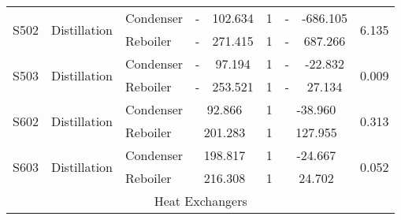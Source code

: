 \begin{table}[h]
{\begin{tabular}{|l|l|l|c|c|c|c|c|c|c|}
\multirow{2}{*}{S502}                      & \multirow{2}{*}{Distillation}        & Condenser      & -                 & 102.634           & 1                               & -                & -686.105         & \multicolumn{2}{c|}{\multirow{2}{*}{6.135}} \\ \cline{3-8}
                                           &                                      & Reboiler       & -                 & 271.415           & 1                               & -                & 687.266          & \multicolumn{2}{c|}{}                       \\ \hline
\multirow{2}{*}{S503}                      & \multirow{2}{*}{Distillation}        & Condenser      & -                 & 97.194            & 1                               & -                & -22.832          & \multicolumn{2}{c|}{\multirow{2}{*}{0.009}} \\ \cline{3-8}
                                           &                                      & Reboiler       & -                 & 253.521           & 1                               & -                & 27.134           & \multicolumn{2}{c|}{}                       \\ \hline
\multirow{2}{*}{S602}                      & \multirow{2}{*}{Distillation}        & Condenser      & \multicolumn{2}{c|}{92.866}           & 1                               & \multicolumn{2}{c|}{-38.960}        & \multicolumn{2}{c|}{\multirow{2}{*}{0.313}} \\ \cline{3-8}
                                           &                                      & Reboiler       & \multicolumn{2}{c|}{201.283}          & 1                               & \multicolumn{2}{c|}{127.955}        & \multicolumn{2}{c|}{}                       \\ \hline
\multirow{2}{*}{S603}                      & \multirow{2}{*}{Distillation}        & Condenser      & \multicolumn{2}{c|}{198.817}          & 1                               & \multicolumn{2}{c|}{-24.667}        & \multicolumn{2}{c|}{\multirow{2}{*}{0.052}} \\ \cline{3-8}
                                           &                                      & Reboiler       & \multicolumn{2}{c|}{216.308}          & 1                               & \multicolumn{2}{c|}{24.702}         & \multicolumn{2}{c|}{}                       \\ \hline
\multicolumn{10}{|c|}{Heat Exchangers}                                                                                                                                                                                                                           \\ \hline

\end{tabular}}
\end{table}
